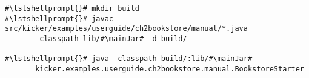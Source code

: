 \begin{lstlisting}[caption=Commands to compile and run the instrumented Bookstore under \UnixLikeSystems{},label=lst:bookstoreStarterLinux]
#\lstshellprompt{}# mkdir build
#\lstshellprompt{}# javac src/kicker/examples/userguide/ch2bookstore/manual/*.java 
       -classpath lib/#\mainJar# -d build/

#\lstshellprompt{}# java -classpath build/:lib/#\mainJar#
       kicker.examples.userguide.ch2bookstore.manual.BookstoreStarter
\end{lstlisting} 